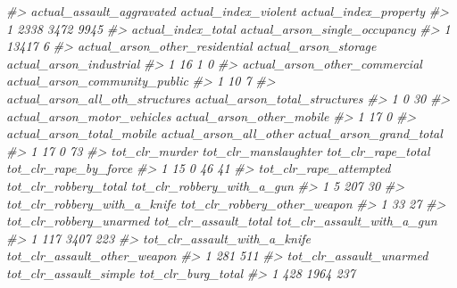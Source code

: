 \documentclass[
]{krantz}
\makeatletter
\newenvironment{Shaded}{\begin{snugshade}}{\end{snugshade}}
\newcommand{\CommentTok}[1]{\textcolor[rgb]{0.37,0.37,0.37}{\textit{#1}}}
\newenvironment{kframe}{%
\medskip{}
\setlength{\fboxsep}{.8em}
 \def\at@end@of@kframe{}%
 \ifinner\ifhmode%
  \def\at@end@of@kframe{\end{minipage}}%
  \begin{minipage}{\columnwidth}%
 \fi\fi%
 \def\FrameCommand##1{\hskip\@totalleftmargin \hskip-\fboxsep
 \colorbox{shadecolor}{##1}\hskip-\fboxsep
     \hskip-\linewidth \hskip-\@totalleftmargin \hskip\columnwidth}%
 \MakeFramed {\advance\hsize-\width
   \@totalleftmargin\z@ \linewidth\hsize
   \@setminipage}}%
 {\par\unskip\endMakeFramed%
 \at@end@of@kframe}
\renewenvironment{Shaded}{\begin{kframe}}{\end{kframe}}
\makeatother
\begin{document}
\begin{Shaded}
\begin{Highlighting}[]
\CommentTok{\#\textgreater{}   actual\_assault\_aggravated actual\_index\_violent actual\_index\_property}
\CommentTok{\#\textgreater{} 1                      2338                 3472                  9945}
\CommentTok{\#\textgreater{}   actual\_index\_total actual\_arson\_single\_occupancy}
\CommentTok{\#\textgreater{} 1              13417                             6}
\CommentTok{\#\textgreater{}   actual\_arson\_other\_residential actual\_arson\_storage actual\_arson\_industrial}
\CommentTok{\#\textgreater{} 1                             16                    1                       0}
\CommentTok{\#\textgreater{}   actual\_arson\_other\_commercial actual\_arson\_community\_public}
\CommentTok{\#\textgreater{} 1                            10                             7}
\CommentTok{\#\textgreater{}   actual\_arson\_all\_oth\_structures actual\_arson\_total\_structures}
\CommentTok{\#\textgreater{} 1                               0                            30}
\CommentTok{\#\textgreater{}   actual\_arson\_motor\_vehicles actual\_arson\_other\_mobile}
\CommentTok{\#\textgreater{} 1                          17                         0}
\CommentTok{\#\textgreater{}   actual\_arson\_total\_mobile actual\_arson\_all\_other actual\_arson\_grand\_total}
\CommentTok{\#\textgreater{} 1                        17                      0                       73}
\CommentTok{\#\textgreater{}   tot\_clr\_murder tot\_clr\_manslaughter tot\_clr\_rape\_total tot\_clr\_rape\_by\_force}
\CommentTok{\#\textgreater{} 1             15                    0                 46                    41}
\CommentTok{\#\textgreater{}   tot\_clr\_rape\_attempted tot\_clr\_robbery\_total tot\_clr\_robbery\_with\_a\_gun}
\CommentTok{\#\textgreater{} 1                      5                   207                         30}
\CommentTok{\#\textgreater{}   tot\_clr\_robbery\_with\_a\_knife tot\_clr\_robbery\_other\_weapon}
\CommentTok{\#\textgreater{} 1                           33                           27}
\CommentTok{\#\textgreater{}   tot\_clr\_robbery\_unarmed tot\_clr\_assault\_total tot\_clr\_assault\_with\_a\_gun}
\CommentTok{\#\textgreater{} 1                     117                  3407                        223}
\CommentTok{\#\textgreater{}   tot\_clr\_assault\_with\_a\_knife tot\_clr\_assault\_other\_weapon}
\CommentTok{\#\textgreater{} 1                          281                          511}
\CommentTok{\#\textgreater{}   tot\_clr\_assault\_unarmed tot\_clr\_assault\_simple tot\_clr\_burg\_total}
\CommentTok{\#\textgreater{} 1                     428                   1964                237}

\end{Highlighting}
\end{Shaded}
\end{document}
